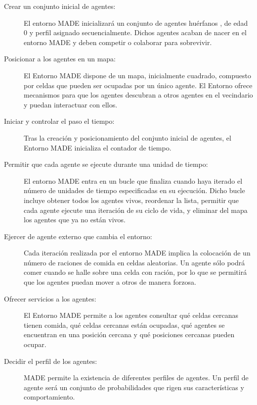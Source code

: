 \begin{description}
   \item[Crear un conjunto inicial de agentes:] 

 	El entorno MADE inicializará un conjunto de agentes huérfanos , de edad 0 y perfil asignado secuencialmente. Dichos agentes acaban de nacer en el entorno MADE y deben competir o colaborar para sobrevivir.
   
   \item[Posicionar a los agentes en un mapa:] El Entorno MADE dispone de un mapa, inicialmente cuadrado, compuesto por celdas que pueden ser ocupadas por un único agente. El Entorno ofrece mecanismos para que los agentes descubran a otros agentes en el vecindario y puedan interactuar con ellos.
   
   \item[Iniciar y controlar el paso el tiempo:] Tras la creación y posicionamiento del conjunto inicial de agentes, el Entorno MADE inicializa el contador de tiempo.
   
   \item[Permitir que cada agente se ejecute durante una unidad de tiempo:] El entorno MADE entra en un bucle que finaliza cuando haya iterado el número de unidades de tiempo especificadas en su ejecución. Dicho bucle incluye obtener todos los agentes vivos, reordenar la lista, permitir que cada agente ejecute una iteración de su  ciclo de vida, y eliminar del mapa los agentes que ya no están vivos. 
   
   \item[Ejercer de agente externo que cambia el entorno:] Cada iteración realizada por el entorno MADE implica la colocación de un número de raciones de comida en celdas aleatorias. Un agente sólo podrá comer cuando se halle sobre una celda con ración, por lo que se permitirá que los agentes puedan mover a otros de manera forzosa.
    
   \item[Ofrecer servicios a los agentes:] El Entorno MADE permite a los agentes consultar qué celdas cercanas tienen comida, qué celdas cercanas están ocupadas, qué agentes se encuentran en una posición cercana y qué posiciones cercanas pueden ocupar.
   
   \item[Decidir el perfil de los agentes:] MADE permite la existencia de diferentes perfiles de agentes. Un perfil de agente será un conjunto de probabilidades que rigen sus características y comportamiento.
   
\end{description}

